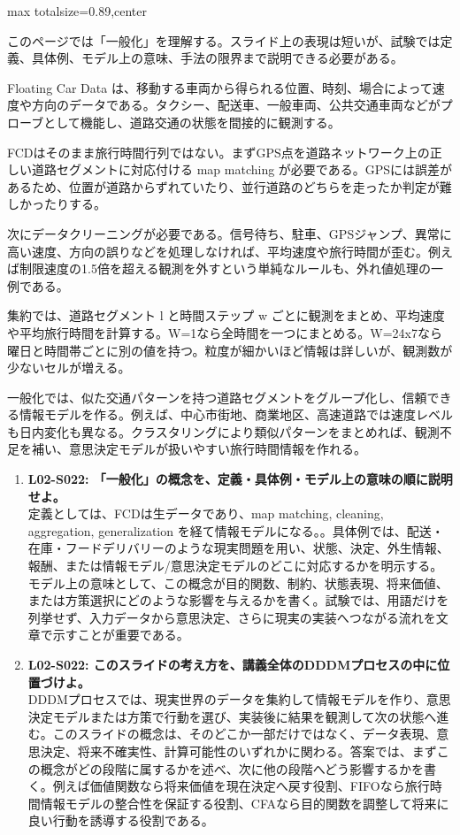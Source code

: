 \begin{minipage}[t]{0.58\textwidth}
\begin{adjustbox}{max totalsize={\textwidth}{0.89\textheight},center}
\begin{minipage}{\textwidth}\scriptsize
{}このページでは「一般化」を理解する。スライド上の表現は短いが、試験では定義、具体例、モデル上の意味、手法の限界まで説明できる必要がある。\par
Floating Car Data は、移動する車両から得られる位置、時刻、場合によって速度や方向のデータである。タクシー、配送車、一般車両、公共交通車両などがプローブとして機能し、道路交通の状態を間接的に観測する。\par
FCDはそのまま旅行時間行列ではない。まずGPS点を道路ネットワーク上の正しい道路セグメントに対応付ける map matching が必要である。GPSには誤差があるため、位置が道路からずれていたり、並行道路のどちらを走ったか判定が難しかったりする。\par
次にデータクリーニングが必要である。信号待ち、駐車、GPSジャンプ、異常に高い速度、方向の誤りなどを処理しなければ、平均速度や旅行時間が歪む。例えば制限速度の1.5倍を超える観測を外すという単純なルールも、外れ値処理の一例である。\par
集約では、道路セグメント l と時間ステップ w ごとに観測をまとめ、平均速度や平均旅行時間を計算する。W=1なら全時間を一つにまとめる。W=24x7なら曜日と時間帯ごとに別の値を持つ。粒度が細かいほど情報は詳しいが、観測数が少ないセルが増える。\par
一般化では、似た交通パターンを持つ道路セグメントをグループ化し、信頼できる情報モデルを作る。例えば、中心市街地、商業地区、高速道路では速度レベルも日内変化も異なる。クラスタリングにより類似パターンをまとめれば、観測不足を補い、意思決定モデルが扱いやすい旅行時間情報を作れる。\par{}\begin{enumerate}\item \textbf{L02-S022: 「一般化」の概念を、定義・具体例・モデル上の意味の順に説明せよ。}\\定義としては、FCDは生データであり、map matching, cleaning, aggregation, generalization を経て情報モデルになる。。具体例では、配送・在庫・フードデリバリーのような現実問題を用い、状態、決定、外生情報、報酬、または情報モデル/意思決定モデルのどこに対応するかを明示する。モデル上の意味として、この概念が目的関数、制約、状態表現、将来価値、または方策選択にどのような影響を与えるかを書く。試験では、用語だけを列挙せず、入力データから意思決定、さらに現実の実装へつながる流れを文章で示すことが重要である。\item \textbf{L02-S022: このスライドの考え方を、講義全体のDDDMプロセスの中に位置づけよ。}\\DDDMプロセスでは、現実世界のデータを集約して情報モデルを作り、意思決定モデルまたは方策で行動を選び、実装後に結果を観測して次の状態へ進む。このスライドの概念は、そのどこか一部だけではなく、データ表現、意思決定、将来不確実性、計算可能性のいずれかに関わる。答案では、まずこの概念がどの段階に属するかを述べ、次に他の段階へどう影響するかを書く。例えば価値関数なら将来価値を現在決定へ戻す役割、FIFOなら旅行時間情報モデルの整合性を保証する役割、CFAなら目的関数を調整して将来に良い行動を誘導する役割である。\end{enumerate}

\end{minipage}
\end{adjustbox}
\end{minipage}

